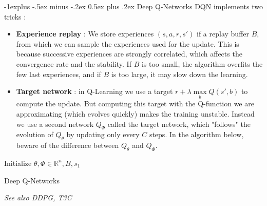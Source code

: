\documentclass[10pt,landscape]{article}
\makeatletter
\renewcommand{\subsection}{\@startsection{subsection}{2}{0mm}%
                                {-1explus -.5ex minus -.2ex}%
                                {0.5ex plus .2ex}%
                                {\normalfont\normalsize\bfseries}}
\makeatother
\begin{document}
\begin{multicols}{3}
\subsection{Deep Q-Networks}
DQN implements two tricks :
\begin{itemize}[leftmargin=*]
    \item \textbf{Experience replay} : We store experiences $(s,a,r,s')$ if a replay buffer $B$, from which we can sample the experiences used for the update. This is because successive experiences are strongly correlated, which affects the convergence rate and the stability. If $B$ is too small, the algorithm overfits the few last experiences, and if $B$ is too large, it may slow down the learning.
    \item \textbf{Target network} : in Q-Learning we use a target $r + \lambda \max\limits_b Q(s',b)$ to compute the update. But computing this target with the Q-function we are approximating (which evolves quickly) makes the training unstable. Instead we use a second network $Q_\Phi$ called the target network, which "follows" the evolution of $Q_\theta$ by updating only every $C$ steps. In the algorithm below, beware of the difference between $Q_\theta$ and $Q_\Phi$.
\end{itemize}


\begin{algorithm}[H]
 Initialize $\theta, \Phi \in \mathbb{R}^n, B, s_1$\\
\caption{Deep Q-Networks}
\end{algorithm}

\begingroup
    \fontsize{5pt}{8pt}
        \textit{See also DDPG, T3C}
\endgroup


\end{multicols}
\end{document}
